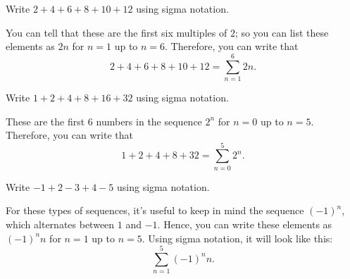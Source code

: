 \documentclass[
  12pt,
  a4paper, oneside]{starmastarticle}
\begin{document}
\begin{tcolorbox}[enhanced jigsaw, left=2mm, colframe=quarto-callout-note-color-frame, toprule=.15mm, bottomrule=.15mm, opacityback=0, colback=white, arc=.35mm, leftrule=.75mm, breakable, rightrule=.15mm]
\begin{minipage}[t]{5.5mm}
\textcolor{quarto-callout-note-color}{\faInfo}
\end{minipage}%
\begin{minipage}[t]{\textwidth - 5.5mm}
Write \(2 + 4 + 6 + 8 + 10 + 12\) using sigma notation.

You can tell that these are the first six multiples of \(2\); so you can
list these elements as \(2n\) for \(n = 1\) up to \(n = 6\). Therefore,
you can write that
\[2 + 4 + 6 + 8 + 10 + 12 = \sum_{n=1}^6 2n.\]\end{minipage}%
\end{tcolorbox}

\begin{tcolorbox}[enhanced jigsaw, left=2mm, colframe=quarto-callout-note-color-frame, toprule=.15mm, bottomrule=.15mm, opacityback=0, colback=white, arc=.35mm, leftrule=.75mm, breakable, rightrule=.15mm]
\begin{minipage}[t]{5.5mm}
\textcolor{quarto-callout-note-color}{\faInfo}
\end{minipage}%
\begin{minipage}[t]{\textwidth - 5.5mm}
Write \(1 + 2 + 4 + 8 + 16 + 32\) using sigma notation.

These are the first 6 numbers in the sequence \(2^n\) for \(n=0\) up to
\(n=5\). Therefore, you can write that
\[1 + 2 + 4 + 8 + 32 = \sum_{n=0}^5 2^n.\]\end{minipage}%
\end{tcolorbox}

\begin{tcolorbox}[enhanced jigsaw, left=2mm, colframe=quarto-callout-note-color-frame, toprule=.15mm, bottomrule=.15mm, opacityback=0, colback=white, arc=.35mm, leftrule=.75mm, breakable, rightrule=.15mm]
\begin{minipage}[t]{5.5mm}
\textcolor{quarto-callout-note-color}{\faInfo}
\end{minipage}%
\begin{minipage}[t]{\textwidth - 5.5mm}
Write \(-1 + 2 -3 + 4 - 5\) using sigma notation.

For these types of sequences, it's useful to keep in mind the sequence
\((-1)^n\), which alternates between \(1\) and \(-1\). Hence, you can
write these elements as \((-1)^nn\) for \(n=1\) up to \(n=5\). Using
sigma notation, it will look like this:
\[\sum_{n=1}^5 (-1)^nn.\]\end{minipage}%
\end{tcolorbox}
\end{document}
